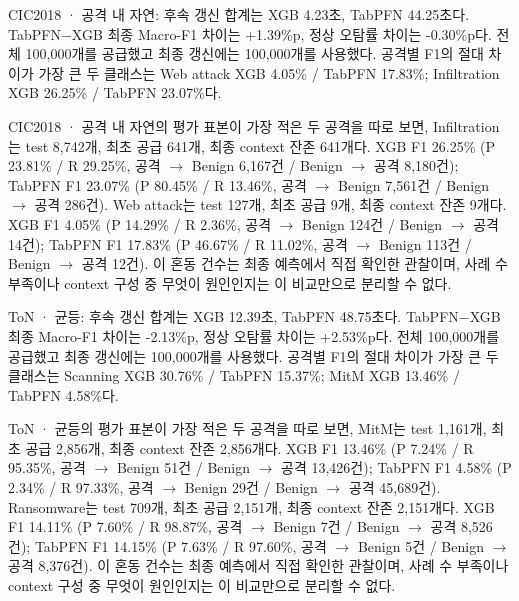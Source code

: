 CIC2018 · 공격 내 자연: 후속 갱신 합계는 XGB 4.23초, TabPFN 44.25초다. TabPFN−XGB 최종 Macro-F1 차이는 +\allowbreak{}1.39\%p, 정상 오탐률 차이는 -0.30\%p다. 전체 100,000개를 공급했고 최종 갱신에는 100,000개를 사용했다. 공격별 F1의 절대 차이가 가장 큰 두 클래스는 Web attack XGB 4.05\% /\allowbreak{} TabPFN 17.83\%; Infiltration XGB 26.25\% /\allowbreak{} TabPFN 23.07\%다.

CIC2018 · 공격 내 자연의 평가 표본이 가장 적은 두 공격을 따로 보면, Infiltration는 test 8,742개, 최초 공급 641개, 최종 context 잔존 641개다. XGB F1 26.25\% (P 23.81\% /\allowbreak{} R 29.25\%, 공격 \ensuremath{\rightarrow} Benign 6,167건 /\allowbreak{} Benign \ensuremath{\rightarrow} 공격 8,180건); TabPFN F1 23.07\% (P 80.45\% /\allowbreak{} R 13.46\%, 공격 \ensuremath{\rightarrow} Benign 7,561건 /\allowbreak{} Benign \ensuremath{\rightarrow} 공격 286건). Web attack는 test 127개, 최초 공급 9개, 최종 context 잔존 9개다. XGB F1 4.05\% (P 14.29\% /\allowbreak{} R 2.36\%, 공격 \ensuremath{\rightarrow} Benign 124건 /\allowbreak{} Benign \ensuremath{\rightarrow} 공격 14건); TabPFN F1 17.83\% (P 46.67\% /\allowbreak{} R 11.02\%, 공격 \ensuremath{\rightarrow} Benign 113건 /\allowbreak{} Benign \ensuremath{\rightarrow} 공격 12건). 이 혼동 건수는 최종 예측에서 직접 확인한 관찰이며, 사례 수 부족이나 context 구성 중 무엇이 원인인지는 이 비교만으로 분리할 수 없다.

ToN · 균등: 후속 갱신 합계는 XGB 12.39초, TabPFN 48.75초다. TabPFN−XGB 최종 Macro-F1 차이는 -2.13\%p, 정상 오탐률 차이는 +\allowbreak{}2.53\%p다. 전체 100,000개를 공급했고 최종 갱신에는 100,000개를 사용했다. 공격별 F1의 절대 차이가 가장 큰 두 클래스는 Scanning XGB 30.76\% /\allowbreak{} TabPFN 15.37\%; MitM XGB 13.46\% /\allowbreak{} TabPFN 4.58\%다.

ToN · 균등의 평가 표본이 가장 적은 두 공격을 따로 보면, MitM는 test 1,161개, 최초 공급 2,856개, 최종 context 잔존 2,856개다. XGB F1 13.46\% (P 7.24\% /\allowbreak{} R 95.35\%, 공격 \ensuremath{\rightarrow} Benign 51건 /\allowbreak{} Benign \ensuremath{\rightarrow} 공격 13,426건); TabPFN F1 4.58\% (P 2.34\% /\allowbreak{} R 97.33\%, 공격 \ensuremath{\rightarrow} Benign 29건 /\allowbreak{} Benign \ensuremath{\rightarrow} 공격 45,689건). Ransomware는 test 709개, 최초 공급 2,151개, 최종 context 잔존 2,151개다. XGB F1 14.11\% (P 7.60\% /\allowbreak{} R 98.87\%, 공격 \ensuremath{\rightarrow} Benign 7건 /\allowbreak{} Benign \ensuremath{\rightarrow} 공격 8,526건); TabPFN F1 14.15\% (P 7.63\% /\allowbreak{} R 97.60\%, 공격 \ensuremath{\rightarrow} Benign 5건 /\allowbreak{} Benign \ensuremath{\rightarrow} 공격 8,376건). 이 혼동 건수는 최종 예측에서 직접 확인한 관찰이며, 사례 수 부족이나 context 구성 중 무엇이 원인인지는 이 비교만으로 분리할 수 없다.

